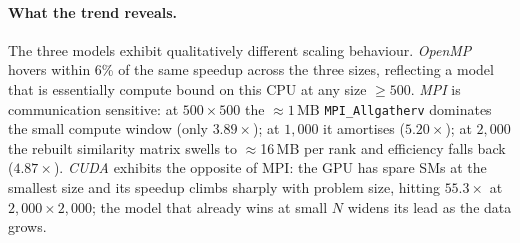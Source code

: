 \documentclass[11pt,a4paper]{article}
\newcommand{\code}[1]{\texttt{\small #1}}
\begin{document}
\begin{table}[!htbp]
\centering
{}
\caption{Problem size sweep at the fastest worker count per technology.
Serial grows as expected ($O(N^2 M)$: $0.99 \rightarrow 8.76 \rightarrow
78.64$\,s tracks the $N^3$ growth factor). OpenMP speedup is stable
($6.45\rightarrow 6.26 \rightarrow 6.05$); MPI improves from $500\times500$
(where \code{MPI\_Allgatherv} is not yet amortised) before declining at the
largest size; \textbf{CUDA speedup grows with $N$ from $32.6\times$ to
$55.3\times$} as the GPU fills its SMs and amortises launch and PCIe
overheads.}
\label{tab:scaling}
\end{table}

\paragraph{What the trend reveals.} The three models exhibit qualitatively
different scaling behaviour. \emph{OpenMP} hovers within 6\% of the same
speedup across the three sizes, reflecting a model that is essentially
compute bound on this CPU at any size $\geq 500$. \emph{MPI} is communication
sensitive: at $500\times500$ the $\approx 1$\,MB \code{MPI\_Allgatherv}
dominates the small compute window (only $3.89\times$); at $1{,}000$ it
amortises ($5.20\times$); at $2{,}000$ the rebuilt similarity matrix swells to
$\approx$16\,MB per rank and efficiency falls back ($4.87\times$). \emph{CUDA}
exhibits the opposite of MPI: the GPU has spare SMs at the smallest size and
its speedup climbs sharply with problem size, hitting $55.3\times$ at
$2{,}000\times2{,}000$; the model that already wins at small $N$ widens
its lead as the data grows.
\end{document}
